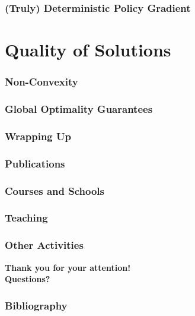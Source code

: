 \documentclass{beamer}
\begin{document}
\begin{frame}
\frametitle{(Truly) Deterministic Policy Gradient}
\end{frame}

\section{Quality of Solutions}
\addtocounter{framenumber}{-1}
\frame{\tableofcontents[currentsection]}

\begin{frame}
\frametitle{Non-Convexity}
\end{frame}

\begin{frame}
\frametitle{Global Optimality Guarantees}
\end{frame}


\begin{frame}
\frametitle{Wrapping Up}
\end{frame}

\begin{frame}
\frametitle{Publications}
\end{frame}

\begin{frame}
\frametitle{Courses and Schools}
\end{frame}

\begin{frame}
\frametitle{Teaching}
\end{frame}

\begin{frame}
\frametitle{Other Activities}
\end{frame}



\begin{frame}[plain]
\centering
{\color{poliblue3} \bf
\vspace{1cm}
{\huge Thank you for your attention!} \\
\vspace{2cm}
{\LARGE Questions?}
}
\end{frame}


\begin{frame}[allowframebreaks]
\frametitle{Bibliography}


\end{frame}

\end{document}
